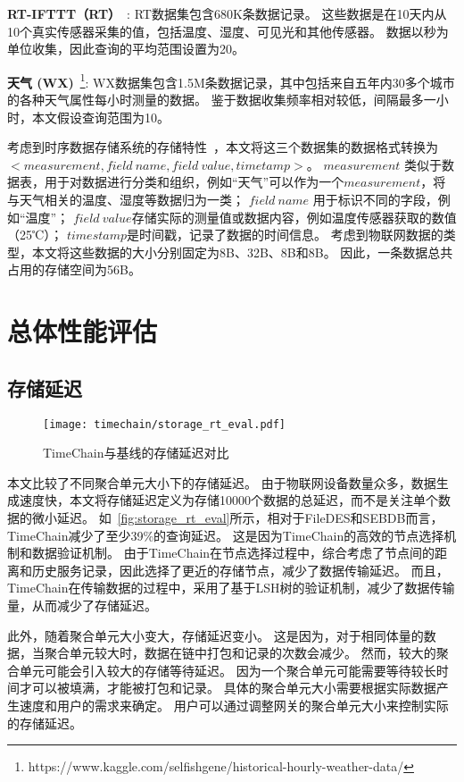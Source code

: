 \textbf{RT-IFTTT（RT）}~\cite{heo2017rt}:
RT数据集包含680K条数据记录。
这些数据是在10天内从10个真实传感器采集的值，包括温度、湿度、可见光和其他传感器。
数据以秒为单位收集，因此查询的平均范围设置为20。

\textbf{天气 (WX)}~\footnote{https://www.kaggle.com/selfishgene/historical-hourly-weather-data/}:
WX数据集包含1.5M条数据记录，其中包括来自五年内30多个城市的各种天气属性每小时测量的数据。
鉴于数据收集频率相对较低，间隔最多一小时，本文假设查询范围为10。

考虑到时序数据存储系统的存储特性~\cite{naqvi2017time}，本文将这三个数据集的数据格式转换为\\ $<measurement, field~name, field~value, timetamp>$。
$measurement$ 类似于数据表，用于对数据进行分类和组织，例如“天气”可以作为一个$measurement$，将与天气相关的温度、湿度等数据归为一类；
$field~name$ 用于标识不同的字段，例如“温度”；
$field~value$存储实际的测量值或数据内容，例如温度传感器获取的数值（25℃）；
$timestamp$是时间戳，记录了数据的时间信息。
考虑到物联网数据的类型，本文将这些数据的大小分别固定为8B、32B、8B和8B。
因此，一条数据总共占用的存储空间为56B。

\section{总体性能评估}

\subsection{存储延迟}
\begin{figure}[t]
    \centering
    \texttt{[image: timechain/storage\_rt\_eval.pdf]}
    \caption{TimeChain与基线的存储延迟对比}
    \label{fig:storage_rt_eval}
\end{figure}
本文比较了不同聚合单元大小下的存储延迟。
由于物联网设备数量众多，数据生成速度快，本文将存储延迟定义为存储10000个数据的总延迟，而不是关注单个数据的微小延迟。
如~\autoref{fig:storage_rt_eval}所示，相对于FileDES和SEBDB而言，TimeChain减少了至少39\%的查询延迟。
这是因为TimeChain的高效的节点选择机制和数据验证机制。
由于TimeChain在节点选择过程中，综合考虑了节点间的距离和历史服务记录，因此选择了更近的存储节点，减少了数据传输延迟。
而且，TimeChain在传输数据的过程中，采用了基于LSH树的验证机制，减少了数据传输量，从而减少了存储延迟。

此外，随着聚合单元大小变大，存储延迟变小。
这是因为，对于相同体量的数据，当聚合单元较大时，数据在链中打包和记录的次数会减少。
然而，较大的聚合单元可能会引入较大的存储等待延迟。
因为一个聚合单元可能需要等待较长时间才可以被填满，才能被打包和记录。
具体的聚合单元大小需要根据实际数据产生速度和用户的需求来确定。
用户可以通过调整网关的聚合单元大小来控制实际的存储延迟。

